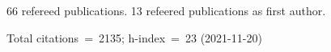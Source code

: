 66 refereed publications. 13 refeered publications as first author.

Total citations~=~2135; h-index~=~23 (2021-11-20)